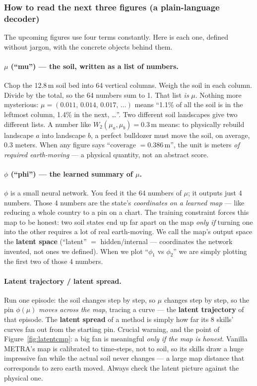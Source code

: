 \documentclass[11pt,a4paper]{article}
\begin{document}
\subsubsection*{How to read the next three figures (a plain-language decoder)}

The upcoming figures use four terms constantly. Here is each one, defined
without jargon, with the concrete objects behind them.

\paragraph{$\mu$ (``mu'') — the soil, written as a list of numbers.}
Chop the 12.8\,m soil bed into 64 vertical columns. Weigh the soil in each
column. Divide by the total, so the 64 numbers sum to 1. That list \emph{is}
$\mu$. Nothing more mysterious: $\mu = (0.011,\, 0.014,\, 0.017,\, \dots)$
means ``1.1\% of all the soil is in the leftmost column, 1.4\% in the next,
\dots''. Two different soil landscapes give two different lists. A number like
$W_2(\mu_a, \mu_b) = 0.3$\,m means: to physically rebuild landscape $a$ into
landscape $b$, a perfect bulldozer must move the soil, on average, 0.3 meters.
When any figure says ``coverage $= 0.386$\,m'', the unit is meters \emph{of
required earth-moving} --- a physical quantity, not an abstract score.

\paragraph{$\phi$ (``phi'') — the learned summary of $\mu$.}
$\phi$ is a small neural network. You feed it the 64 numbers of $\mu$; it
outputs just 4 numbers. Those 4 numbers are the state's \emph{coordinates on a
learned map} --- like reducing a whole country to a pin on a chart. The
training constraint forces this map to be honest: two soil states end up far
apart on the map \emph{only if} turning one into the other requires a lot of
real earth-moving. We call the map's output space the \textbf{latent space}
(``latent'' $=$ hidden/internal --- coordinates the network invented, not ones
we defined). When we plot ``$\phi_1$ vs $\phi_2$'' we are simply plotting the
first two of those 4 numbers.

\paragraph{Latent trajectory / latent spread.}
Run one episode: the soil changes step by step, so $\mu$ changes step by step,
so the pin $\phi(\mu)$ \emph{moves across the map}, tracing a curve --- the
\textbf{latent trajectory} of that episode. The \textbf{latent spread} of a
method is simply how far its 8 skills' curves fan out from the starting pin.
Crucial warning, and the point of Figure~\ref{fig:latentcmp}: a big fan is
meaningful \emph{only if the map is honest}. Vanilla METRA's map is calibrated
to time-steps, not to soil, so its skills draw a huge impressive fan while the
actual soil never changes --- a large map distance that corresponds to zero
earth moved. Always check the latent picture against the physical one.
\end{document}
